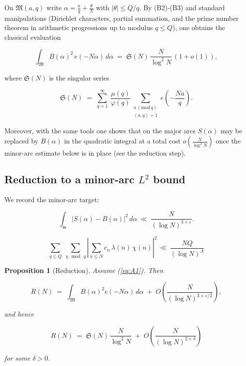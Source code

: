 \documentclass[11pt]{article}
\def\eqref#1{(\ref{#1})}%
\newtheorem{proposition}[lemma]{Proposition}
\theoremstyle{definition}
\theoremstyle{remark}
\numberwithin{equation}{part}
\begin{document}
On $\mathfrak M(a,q)$ write $\alpha=\tfrac{a}{q}+\tfrac{\theta}{N}$ with
$|\theta|\le Q/q$. By (B2)-(B3) and standard manipulations (Dirichlet characters, partial summation, and the prime number theorem in arithmetic progressions up to modulus $q\le Q$), one obtains the classical evaluation

$$
	\int_{\mathfrak M} B(\alpha)^2\,e(-N\alpha)\,d\alpha
	\;=\;\mathfrak S(N)\,\frac{N}{\log^2 N}\,(1+o(1)),
$$

where $\mathfrak S(N)$ is the singular series

$$
	\mathfrak S(N)\;=\;\sum_{q=1}^{\infty}\ \frac{\mu(q)}{\varphi(q)}\!
	\sum_{\substack{a\,(\mathrm{mod}\,q)\\(a,q)=1}} e\!\left(-\frac{Na}{q}\right).
$$

Moreover, with the same tools one shows that on the major arcs $S(\alpha)$ may be replaced by $B(\alpha)$ in the quadratic integral at a total cost $o\!\left(\tfrac{N}{\log^2 N}\right)$ once the minor-arc estimate below is in place (see the reduction step).


\subsection{Reduction to a minor-arc \texorpdfstring{$L^2$}{L-2} bound}

We record the minor-arc target:

\begin{equation}\label{eq:A1}
	\int_{\mathfrak m}|S(\alpha)-B(\alpha)|^2\,d\alpha\ \ll\ \frac{N}{(\log N)^{3+\varepsilon}}.
\end{equation}

\begin{equation}\label{eq:char-second-moment}\sum_{q\le Q}\ \sum_{\chi\,\bmod\, q}\left|\sum_{n\le N} c_n\,\lambda(n)\,\chi(n)\right|^{2}\,\ll\, \frac{NQ}{(\log N)^A}\end{equation}
\begin{proposition}[Reduction]\label{prop:reduction}
	Assume \eqref{eq:A1}. Then

	$$
		R(N)\;=\;\int_{\mathfrak M} B(\alpha)^2 e(-N\alpha)\,d\alpha\;+\;O\!\left(\frac{N}{(\log N)^{3+\varepsilon/2}}\right),
	$$

	and hence

	$$
		R(N)\;=\;\mathfrak S(N)\,\frac{N}{\log^{2}N}\;+\;O\!\left(\frac{N}{(\log N)^{2+\delta}}\right)
	$$

	for some $\delta>0$.

\end{proposition}
\end{document}
